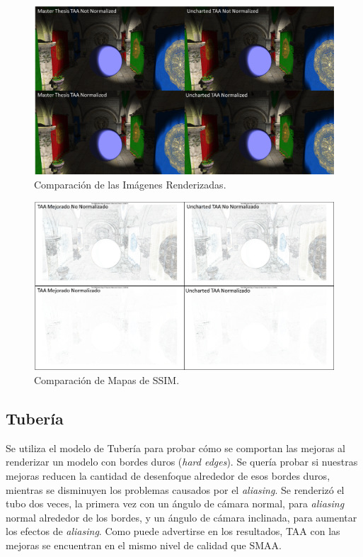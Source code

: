 \documentclass[pregrado]{tesis-usb} %
\begin{document}
\begin{figure}[!htb]
	\centering
	\includegraphics[scale=0.41]{images/results/sharpen_test_render.png}
	\caption{Comparación de las Imágenes Renderizadas.}\label{fig:sharpen_render}
\end{figure}

\begin{figure}[!htb]
	\centering
	\includegraphics[scale=0.9]{images/results/sharpen_test_ssim.png}
	\caption{Comparación de Mapas de SSIM.}\label{fig:sharpen_ssim}
\end{figure}

\FloatBarrier
\subsection{Tubería}
Se utiliza el modelo de Tubería para probar cómo se comportan las mejoras al renderizar un modelo con bordes duros (\textit{hard edges}). Se quería probar si nuestras mejoras reducen la cantidad de desenfoque alrededor de esos bordes duros, mientras se disminuyen los problemas causados por el \textit{aliasing}. Se renderizó el tubo dos veces, la primera vez con un ángulo de cámara normal, para \textit{aliasing} normal alrededor de los bordes, y un ángulo de cámara inclinada, para aumentar los efectos de \textit{aliasing}. Como puede advertirse en los resultados, TAA con las mejoras se encuentran en el mismo nivel de calidad que SMAA.
\end{document}
